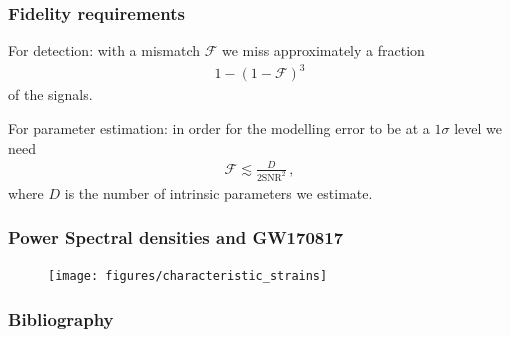 \documentclass{beamer}
\begin{document}
\begin{frame}
    \frametitle{Fidelity requirements}
    For detection: with a mismatch \(\mathcal{F}\) we miss approximately a fraction 
    \begin{align}
    1 - (1 - \mathcal{F})^3
    \end{align}
    of the signals. 
    
    For parameter estimation: in order for the modelling error to be at a \(1 \sigma \) level we need 
    \begin{align}
    \mathcal{F} \lesssim \frac{D}{2 \text{SNR}^2}
    \,,
    \end{align}
    where \(D\) is the number of intrinsic parameters we estimate.
\end{frame}

\begin{frame}
    \frametitle{Power Spectral densities and GW170817}
    \begin{figure}[ht]
    \centering
    \vspace*{-.25cm}
    \texttt{[image: figures/characteristic\_strains]}
    \label{fig:characteristic_strains}
    \end{figure}
\end{frame}

\begin{frame}
    \frametitle{Bibliography}
    \printbibliography
\end{frame}
\end{document}
